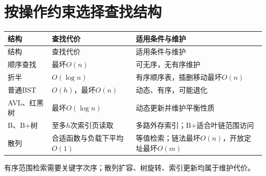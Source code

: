 \section{按操作约束选择查找结构}\label{DS07-comparison}

\par\smallskip
{\fontsize{9.3}{12}\selectfont\setlength{\tabcolsep}{2.5pt}\setlength{\LTleft}{0pt}\setlength{\LTright}{0pt}
\begin{longtable}{@{}>{\raggedright\arraybackslash}p{}>{\raggedright\arraybackslash}p{}>{\raggedright\arraybackslash}p{}@{}}
\toprule
结构 & 查找代价 & 适用条件与维护 \\

\midrule\endfirsthead\toprule
结构 & 查找代价 & 适用条件与维护 \\

\midrule\endhead\bottomrule\endfoot
顺序查找 & 最坏\(O(n)\) & 可无序，无有序维护 \\

折半 & \(O(\log n)\) & 有序顺序表，插删移动最坏\(O(n)\) \\

普通BST & \(O(h)\)，最坏\(O(n)\) & 动态、有序，可能退化 \\

AVL、红黑树 & 最坏\(O(\log n)\) & 动态更新并维护平衡性质 \\

B、B+树 & 至多\(h\)次索引页读取 & 多路外存索引；B+适合叶链范围访问 \\

散列 & 合适函数与负载下平均\(O(1)\) & 等值检索；链法最坏\(O(n)\)，开放定址最坏\(O(m)\) \\

\end{longtable}}
\par\smallskip

有序范围检索需要关键字次序；散列扩容、树旋转、索引更新均属于维护代价。
